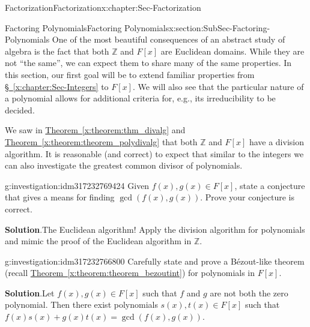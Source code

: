 \documentclass[oneside,10pt,]{book}
\newcommand{\blocktitlefont}{\relax}
\newcommand{\xreffont}{\relax}
\numberwithin{equation}{section}
\def\Z{{\mathbb Z}}
\begin{document}
\begin{chapterptx}{Factorization}{}{Factorization}{}{}{x:chapter:Sec-Factorization}
%
%
\typeout{************************************************}
\typeout{************************************************}
%
\begin{sectionptx}{Factoring Polynomials}{}{Factoring Polynomials}{}{}{x:section:SubSec-Factoring-Polynomials}
One of the most beautiful consequences of an abstract study of algebra is the fact that both \(\Z\) and \(F[x]\) are Euclidean domains. While they are not ``the same'', we can expect them to share many of the same properties. In this section, our first goal will be to extend familiar properties from \hyperref[x:chapter:Sec-Integers]{§~{\xreffont\ref{x:chapter:Sec-Integers}}} to \(F[x]\). We will also see that the particular nature of a polynomial allows for additional criteria for, e.g., its irreducibility to be decided.%
\par
We saw in \hyperref[x:theorem:thm_divalg]{Theorem~{\xreffont\ref{x:theorem:thm_divalg}}} and \hyperref[x:theorem:theorem_polydivalg]{Theorem~{\xreffont\ref{x:theorem:theorem_polydivalg}}} that both \(\Z\) and \(F[x]\) have a division algorithm. It is reasonable (and correct) to expect that similar to the integers we can also investigate the greatest common divisor of polynomials.%
\begin{investigation}{}{g:investigation:idm317232769424}%
Given \(f(x),g(x)\in F[x]\), state a conjecture that gives a means for finding \(\gcd(f(x),g(x))\). Prove your conjecture is correct.%
\par\smallskip%
\noindent\textbf{\blocktitlefont Solution}.\hypertarget{g:solution:idm317232772816}{}\quad{}The Euclidean algorithm! Apply the division algorithm for polynomials and mimic the proof of the Euclidean algorithm in \(\Z\).%
\end{investigation}
\begin{investigation}{}{g:investigation:idm317232766800}%
Carefully state and prove a Bézout-like theorem (recall \hyperref[x:theorem:theorem_bezoutint]{Theorem~{\xreffont\ref{x:theorem:theorem_bezoutint}}}) for polynomials in \(F[x]\).%
\par\smallskip%
\noindent\textbf{\blocktitlefont Solution}.\hypertarget{g:solution:idm317232765136}{}\quad{}Let \(f(x),
g(x)\in F[x]\) such that \(f\) and \(g\) are not both the zero polynomial. Then there exist polynomials \(s(x),
t(x)\in F[x]\) such that \(f(x) s(x) + g(x) t(x) = \gcd(f(x),g(x))\).%
\end{investigation}

\end{sectionptx}
\end{chapterptx}
\end{document}
